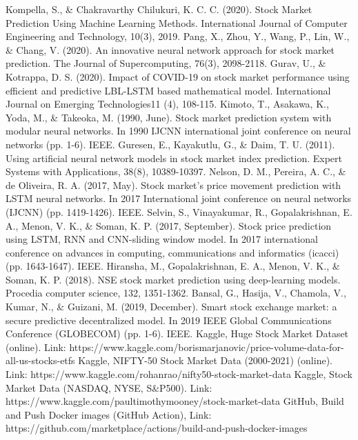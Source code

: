 \documentclass[conference]{IEEEtran}
\begin{document}
\begin{thebibliography}{00}
 Kompella, S., \& Chakravarthy Chilukuri, K. C. C. (2020). Stock Market Prediction Using Machine Learning Methods. International Journal of Computer Engineering and Technology, 10(3), 2019.
 Pang, X., Zhou, Y., Wang, P., Lin, W., \& Chang, V. (2020). An innovative neural network approach for stock market prediction. The Journal of Supercomputing, 76(3), 2098-2118.
 Gurav, U., \& Kotrappa, D. S. (2020). Impact of COVID-19 on stock market performance using efficient and predictive LBL-LSTM based mathematical model. International Journal on Emerging Technologies11 (4), 108-115.
 Kimoto, T., Asakawa, K., Yoda, M., \& Takeoka, M. (1990, June). Stock market prediction system with modular neural networks. In 1990 IJCNN international joint conference on neural networks (pp. 1-6). IEEE.
 Guresen, E., Kayakutlu, G., \& Daim, T. U. (2011). Using artificial neural network models in stock market index prediction. Expert Systems with Applications, 38(8), 10389-10397.
 Nelson, D. M., Pereira, A. C., \& de Oliveira, R. A. (2017, May). Stock market's price movement prediction with LSTM neural networks. In 2017 International joint conference on neural networks (IJCNN) (pp. 1419-1426). IEEE.
 Selvin, S., Vinayakumar, R., Gopalakrishnan, E. A., Menon, V. K., \& Soman, K. P. (2017, September). Stock price prediction using LSTM, RNN and CNN-sliding window model. In 2017 international conference on advances in computing, communications and informatics (icacci) (pp. 1643-1647). IEEE.
 Hiransha, M., Gopalakrishnan, E. A., Menon, V. K., \& Soman, K. P. (2018). NSE stock market prediction using deep-learning models. Procedia computer science, 132, 1351-1362.
 Bansal, G., Hasija, V., Chamola, V., Kumar, N., \& Guizani, M. (2019, December). Smart stock exchange market: a secure predictive decentralized model. In 2019 IEEE Global Communications Conference (GLOBECOM) (pp. 1-6). IEEE.
 Kaggle, Huge Stock Market Dataset (online). Link: https://www.kaggle.com/borismarjanovic/price-volume-data-for-all-us-stocks-etfs
 Kaggle, NIFTY-50 Stock Market Data (2000-2021) (online). Link: https://www.kaggle.com/rohanrao/nifty50-stock-market-data
 Kaggle, Stock Market Data (NASDAQ, NYSE, S\&P500). Link: https://www.kaggle.com/paultimothymooney/stock-market-data
 GitHub, Build and Push Docker images (GitHub Action), Link: https://github.com/marketplace/actions/build-and-push-docker-images

\end{thebibliography}
\end{document}
